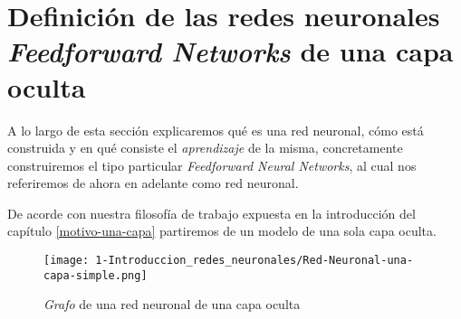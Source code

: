 %

\section{Definición de las redes neuronales \textit{Feedforward Networks} 
de una capa oculta} \label{sec:redes-neuronales-intro-una-capa}

\reversemarginpar
\setlength{\marginparwidth}{\smallMarginSize}
\normalmarginpar
\setlength{\marginparwidth}{\bigMarginSize}


A lo largo de esta sección  explicaremos qué es una red neuronal, cómo está construida y en qué consiste el \textit{aprendizaje} de la misma, concretamente
construiremos el tipo particular \textit{Feedforward Neural Networks}, al cual nos referiremos de ahora
en adelante como red neuronal.

De acorde con nuestra filosofía de trabajo expuesta en la introducción del capítulo \ref{motivo-una-capa} partiremos de un modelo de una sola capa oculta. 

\begin{figure}[h!]
    \centering
    \texttt{[image: 1-Introduccion\_redes\_neuronales/Red-Neuronal-una-capa-simple.png]}
    \caption{\textit{Grafo} de una red neuronal de una capa oculta}
    \label{img:grafo-red-neuronal-una-capa-oculta}
\end{figure}

